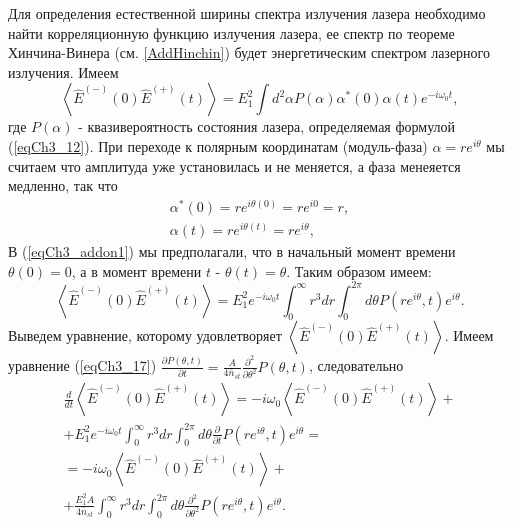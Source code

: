 Для определения естественной ширины спектра излучения лазера
необходимо найти корреляционную функцию излучения лазера, ее спектр по
теореме Хинчина-Винера (см. \autoref{AddHinchin}) будет
энергетическим спектром лазерного излучения. Имеем
\begin{equation}
\left<\hat{E}^{(-)}\left(0\right)\hat{E}^{(+)}\left(t\right)\right>
= E_1^2\int d^2\alpha P\left(\alpha\right) \alpha^{*}\left(0\right)\alpha\left(t\right) e^{-i
  \omega_0 t},
\nonumber
\end{equation}
где $P\left(\alpha\right)$ - квазивероятность состояния лазера,
определяемая формулой (\ref{eqCh3_12}). 
При переходе к полярным координатам
(модуль-фаза) $\alpha = r e^{i \theta}$
мы считаем что амплитуда уже
установилась и не меняется, а фаза менеяется медленно, так что 
\begin{eqnarray}
\alpha^{*}\left(0\right) = r e^{i\theta\left(0\right)} = r e^{i 0} = r,
\nonumber \\
\alpha\left(t\right) = r e^{i\theta\left(t\right)} = r e^{i \theta},
\label{eqCh3_addon1}
\end{eqnarray}
В (\ref{eqCh3_addon1}) мы предполагали, что в начальный момент времени 
$\theta\left(0\right) = 0$, а в момент времени $t$ - $\theta\left(t\right) = \theta$.
Таким образом имеем:
\begin{equation}
\left<\hat{E}^{(-)}\left(0\right)\hat{E}^{(+)}\left(t\right)\right>
= E_1^2 e^{-i
  \omega_0 t}\int_0^{\infty}r^3 d r \int_0^{2 \pi}d \theta P\left(r
e^{i \theta}, t\right) e^{i \theta}.
\nonumber
\end{equation}
Выведем уравнение, которому удовлетворяет 
$\left<\hat{E}^{(-)}\left(0\right)\hat{E}^{(+)}\left(t\right)\right>$. 
Имеем уравнение (\ref{eqCh3_17}) 
\(
\frac{\partial P \left(\theta, t\right)}{\partial t} = 
\frac{A}{4 \bar{n}_{st}}
\frac{\partial^2}{\partial \theta^2}
P \left(\theta, t\right)
\),
следовательно
\begin{eqnarray}
\frac{d}{dt}\left<\hat{E}^{(-)}\left(0\right)\hat{E}^{(+)}\left(t\right)\right>
= -i \omega_0
\left<\hat{E}^{(-)}\left(0\right)\hat{E}^{(+)}\left(t\right)\right>+
\nonumber \\
+ E_1^2 e^{-i
  \omega_0 t}\int_0^{\infty}r^3 d r \int_0^{2 \pi}d \theta
\frac{\partial}{\partial t}P\left(r
e^{i \theta}, t\right) e^{i \theta}
=
\nonumber \\
=
-i \omega_0
\left<\hat{E}^{(-)}\left(0\right)\hat{E}^{(+)}\left(t\right)\right>+
\nonumber \\ 
+
\frac{E_1^2 A}{4 \bar{n}_{st}} 
\int_0^{\infty}r^3 d r 
\int_0^{2 \pi}
d \theta
\frac{\partial^2}{\partial \theta^2}P\left(r
e^{i \theta}, t\right) e^{i \theta}.
\label{eqPart2Ch1_add84_1}
\end{eqnarray}
